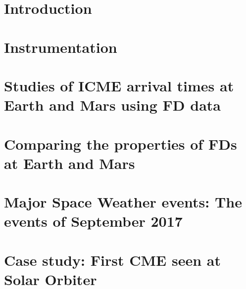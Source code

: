 \documentclass[ twoside,openright,titlepage,numbers=noenddot,headinclude,%
footinclude=true,cleardoublepage=empty,abstractoff, %
BCOR=10mm,paper=a4,fontsize=11pt,%
ngerman,american]{scrreprt} %
\begin{document}
\frenchspacing
\raggedbottom
{} %
\pagestyle{plain}



\cleardoublepage

\cleardoublepage

%



\cleardoublepage
{}
\setcounter{page}{1}	

\chapter{Introduction}



\chapter{Instrumentation}



\chapter{Studies of ICME arrival times at Earth and Mars using FD data}



\chapter{Comparing the properties of FDs at Earth and Mars}



\chapter{Major Space Weather events: The events of September 2017}



\chapter{Case study: First CME seen at Solar Orbiter}
\end{document}
